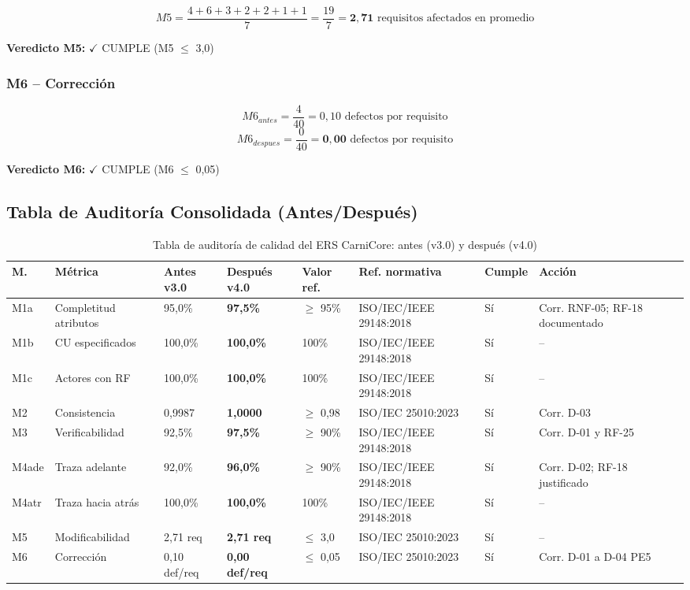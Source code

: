 \documentclass[11pt,a4paper]{article}
\begin{document}
\[ M5 = \frac{4 + 6 + 3 + 2 + 2 + 1 + 1}{7} = \frac{19}{7} = \mathbf{2{,}71} \text{ requisitos afectados en promedio} \]

\textbf{Veredicto M5:} $\checkmark$ CUMPLE (M5 $\leq$ 3,0)

\subsubsection{M6 -- Corrección}

\[ M6_{antes} = \frac{4}{40} = 0{,}10 \text{ defectos por requisito} \]
\[ M6_{despues} = \frac{0}{40} = \mathbf{0{,}00} \text{ defectos por requisito} \]

\textbf{Veredicto M6:} $\checkmark$ CUMPLE (M6 $\leq$ 0,05)

\subsection{Tabla de Auditoría Consolidada (Antes/Después)}

\begin{table}[H]
\centering
\scriptsize
\begin{tabular}{|p{0.7cm}|p{1.9cm}|p{1.6cm}|p{1.7cm}|p{1.5cm}|p{2.1cm}|p{1cm}|p{2.1cm}|}
\hline
\textbf{M.} & \textbf{Métrica} & \textbf{Antes v3.0} & \textbf{Después v4.0} & \textbf{Valor ref.} & \textbf{Ref. normativa} & \textbf{Cumple} & \textbf{Acción} \\
\hline
M1a & Completitud atributos & 95,0\% & \textbf{97,5\%} & $\geq$ 95\% & ISO/IEC/IEEE 29148:2018 & Sí & Corr. RNF-05; RF-18 documentado \\
\hline
M1b & CU especificados & 100,0\% & \textbf{100,0\%} & 100\% & ISO/IEC/IEEE 29148:2018 & Sí & -- \\
\hline
M1c & Actores con RF & 100,0\% & \textbf{100,0\%} & 100\% & ISO/IEC/IEEE 29148:2018 & Sí & -- \\
\hline
M2 & Consistencia & 0,9987 & \textbf{1,0000} & $\geq$ 0,98 & ISO/IEC 25010:2023 & Sí & Corr. D-03 \\
\hline
M3 & Verificabilidad & 92,5\% & \textbf{97,5\%} & $\geq$ 90\% & ISO/IEC/IEEE 29148:2018 & Sí & Corr. D-01 y RF-25 \\
\hline
M4ade & Traza adelante & 92,0\% & \textbf{96,0\%} & $\geq$ 90\% & ISO/IEC/IEEE 29148:2018 & Sí & Corr. D-02; RF-18 justificado \\
\hline
M4atr & Traza hacia atrás & 100,0\% & \textbf{100,0\%} & 100\% & ISO/IEC/IEEE 29148:2018 & Sí & -- \\
\hline
M5 & Modificabilidad & 2,71 req & \textbf{2,71 req} & $\leq$ 3,0 & ISO/IEC 25010:2023 & Sí & -- \\
\hline
M6 & Corrección & 0,10 def/req & \textbf{0,00 def/req} & $\leq$ 0,05 & ISO/IEC 25010:2023 & Sí & Corr. D-01 a D-04 PE5 \\
\hline
\end{tabular}
\normalsize
\caption{Tabla de auditoría de calidad del ERS CarniCore: antes (v3.0) y después (v4.0)}
\label{tab:auditoria}
\end{table}
\end{document}
